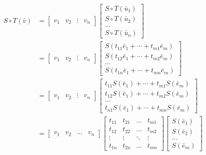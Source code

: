 \begin{commentary}
\begin{align*}
	S \circ T(\bar{v}) & =  \begin{bmatrix} v_1 & v_2 & \vdots & v_n  \end{bmatrix} \begin{bmatrix} S \circ T(\bar{u}_1) \\ S \circ T(\bar{u}_2) \\ \dots \\ S \circ T(\bar{u}_n) \end{bmatrix} \\
	& =  \begin{bmatrix} v_1 & v_2 & \vdots & v_n  \end{bmatrix}\begin{bmatrix} S(t_{11}\bar{e}_1 + \dotsb + t_{m1}\bar{e}_m) \\ S(t_{12}\bar{e}_1 + \dotsb + t_{m2}\bar{e}_m) \\ \dots \\ S(t_{1n}\bar{e}_1 + \dotsb + t_{mn}\bar{e}_m) \end{bmatrix} \\
	& =  \begin{bmatrix} v_1 & v_2 & \vdots & v_n  \end{bmatrix}\begin{bmatrix} t_{11}S(\bar{e}_1) + \dotsb + t_{m1}S(\bar{e}_m) \\ t_{12}S(\bar{e}_1) + \dotsb + t_{m2}S(\bar{e}_m) \\ \dots \\ t_{n1}S(\bar{e}_1) + \dotsb + t_{mn}S(\bar{e}_m) \end{bmatrix} \\
	& = \begin{bmatrix} v_1 & v_2 & \dots & v_n  \end{bmatrix} \begin{bmatrix} t_{11} & t_{21} & \dots & t_{m1} \\ t_{12} & t_{22} & \dots & t_{m2} \\ \vdots & \vdots & \ddots & \vdots \\ t_{1n} & t_{2n} & \dots & t_{mn} \end{bmatrix} \begin{bmatrix} S(\bar{e}_1) \\ S(\bar{e}_2) \\ \dots \\ S(\bar{e}_m) \end{bmatrix} \\

\end{align*}
\end{commentary}
